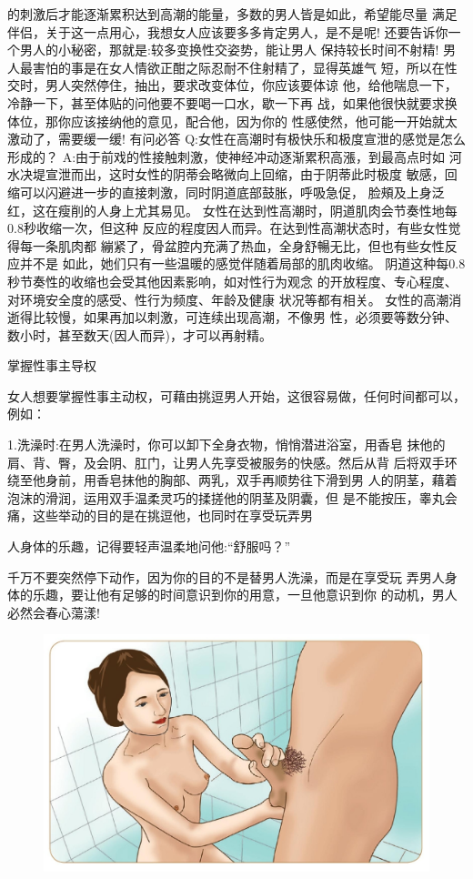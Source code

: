 \documentclass[12pt,UTF8]{ctexbook}
\begin{document}
的刺激后才能逐渐累积达到高潮的能量，多数的男人皆是如此，希望能尽量
满足伴侣，关于这一点用心，我想女人应该要多多肯定男人，是不是呢!
还要告诉你一个男人的小秘密，那就是:较多变换性交姿势，能让男人
保持较长时间不射精!
男人最害怕的事是在女人情欲正酣之际忍耐不住射精了，显得英雄气
短，所以在性交时，男人突然停住，抽出，要求改变体位，你应该要体谅
他，给他喘息一下，冷静一下，甚至体贴的问他要不要喝一口水，歇一下再
战，如果他很快就要求换体位，那你应该接纳他的意见，配合他，因为你的
性感使然，他可能一开始就太激动了，需要缓一缓!
有问必答
Q:女性在高潮时有极快乐和极度宣泄的感觉是怎么形成的？
A:由于前戏的性接触刺激，使神经冲动逐渐累积高漲，到最高点时如
河水决堤宣泄而出，这时女性的阴蒂会略微向上回缩，由于阴蒂此时极度
敏感，回缩可以闪避进一步的直接刺激，同时阴道底部鼓胀，呼吸急促，
脸頰及上身泛红，这在瘦削的人身上尤其易见。
女性在达到性高潮时，阴道肌肉会节奏性地每0.8秒收缩一次，但这种
反应的程度因人而异。在达到性高潮状态时，有些女性觉得每一条肌肉都
繃紧了，骨盆腔内充满了热血，全身舒暢无比，但也有些女性反应并不是
如此，她们只有一些温暖的感觉伴随着局部的肌肉收缩。
阴道这种每0.8秒节奏性的收缩也会受其他因素影响，如对性行为观念
的开放程度、专心程度、对环境安全度的感受、性行为频度、年龄及健康
状况等都有相关。
女性的高潮消逝得比较慢，如果再加以刺激，可连续出现高潮，不像男
性，必须要等数分钟、数小时，甚至数天(因人而异)，才可以再射精。

掌握性事主导权

女人想要掌握性事主动权，可藉由挑逗男人开始，这很容易做，任何时间都可以，例如：

1.洗澡时:在男人洗澡时，你可以卸下全身衣物，悄悄潜进浴室，用香皂
抹他的肩、背、臀，及会阴、肛门，让男人先享受被服务的快感。然后从背
后将双手环绕至他身前，用香皂抹他的胸部、两乳，双手再顺势往下滑到男
人的阴茎，藉着泡沫的滑润，运用双手温柔灵巧的揉搓他的阴茎及阴囊，但
是不能按压，睾丸会痛，这些举动的目的是在挑逗他，也同时在享受玩弄男

人身体的乐趣，记得要轻声温柔地问他:“舒服吗？”

千万不要突然停下动作，因为你的目的不是替男人洗澡，而是在享受玩
弄男人身体的乐趣，要让他有足够的时间意识到你的用意，一旦他意识到你
的动机，男人必然会春心蕩漾!

\begin{figure}[htbp]
	\centering
	\includegraphics[width=0.7\linewidth]{14}
	\caption{}
	\label{fig:1}
\end{figure}
\end{document}
